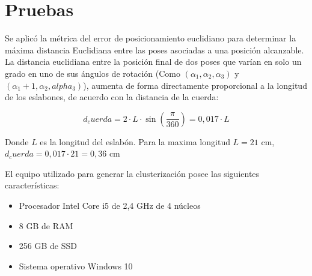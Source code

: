 \section{Pruebas}

Se aplicó la métrica del error de posicionamiento euclidiano para determinar la máxima distancia Euclidiana entre las poses asociadas a una posición alcanzable. La distancia euclidiana entre la posición final de dos poses que varían en solo un grado en uno de sus ángulos de rotación (Como $(\alpha_1,\alpha_2,\alpha_3)$ y $(\alpha_1 + 1, \alpha_2, alpha_3)$), aumenta de forma directamente proporcional a la longitud de los eslabones, de acuerdo con la distancia de la cuerda:

\begin{equation}
	d_cuerda = 2 \cdot L \cdot \sin(\frac{\pi}{360}) = 0,017 \cdot L
\end{equation}

Donde $L$ es la longitud del eslabón. Para la maxima longitud $L = 21$ cm, $d_cuerda = 0,017 \cdot 21 = 0,36$ cm

El equipo utilizado para generar la clusterización posee las siguientes características:

\begin{itemize}
	\item Procesador Intel Core i5 de 2,4 GHz de 4 núcleos
	\item 8 GB de RAM
	\item 256 GB de SSD
	\item Sistema operativo Windows 10
\end{itemize}

